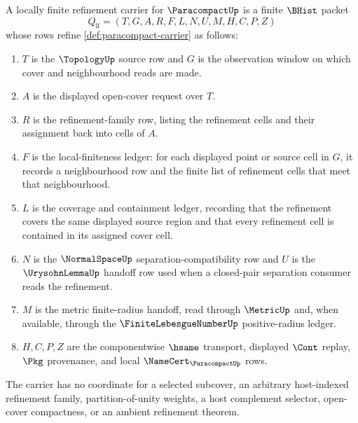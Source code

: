 \begin{definition}
\label{def:paracompact-locally-finite-refinement-carrier}
A locally finite refinement carrier for $\ParacompactUp$ is a finite $\BHist$ packet
$$
Q_{\mathrm{lf}}=(T,G,A,R,F,L,N,U,M,H,C,P,Z)
$$
whose rows refine \autoref{def:paracompact-carrier} as follows:
\begin{enumerate}
\item $T$ is the $\TopologyUp$ source row and $G$ is the observation window on which cover and neighbourhood reads are made.
\item $A$ is the displayed open-cover request over $T$.
\item $R$ is the refinement-family row, listing the refinement cells and their assignment back into cells of $A$.
\item $F$ is the local-finiteness ledger: for each displayed point or source cell in $G$, it records a neighbourhood row and the finite list of refinement cells that meet that neighbourhood.
\item $L$ is the coverage and containment ledger, recording that the refinement covers the same displayed source region and that every refinement cell is contained in its assigned cover cell.
\item $N$ is the $\NormalSpaceUp$ separation-compatibility row and $U$ is the $\UrysohnLemmaUp$ handoff row used when a closed-pair separation consumer reads the refinement.
\item $M$ is the metric finite-radius handoff, read through $\MetricUp$ and, when available, through the $\FiniteLebesgueNumberUp$ positive-radius ledger.
\item $H,C,P,Z$ are the componentwise $\hsame$ transport, displayed $\Cont$ replay, $\Pkg$ provenance, and local $\NameCert_{\ParacompactUp}$ rows.
\end{enumerate}
The carrier has no coordinate for a selected subcover, an arbitrary host-indexed refinement family, partition-of-unity weights, a host complement selector, open-cover compactness, or an ambient refinement theorem.
\end{definition}

